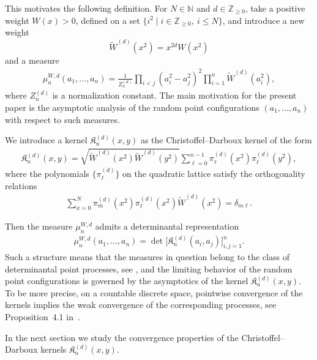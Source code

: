 \documentclass[reqno,11pt]{amsart}
\newcommand{\NN}{\mathbb{N}}
\newcommand{\ZZ}{\mathbb{Z}}
\theoremstyle{plain}
\theoremstyle{definition}
\numberwithin{equation}{section}
\begin{document}
This motivates the following definition. 
For $N\in\NN$ and $d\in\ZZ_{\geq0}$, take a positive weight $W(x)>0$, defined on a set $\{i^2\mid i\in\ZZ_{\geq0},\ i\leq N\}$, and introduce a new weight
\begin{equation*}
    \widetilde{W}^{(d)}(x^2)=x^{2d}W(x^2)
\end{equation*}
and a measure 
\begin{align}
	\mu^{W,d}_n(a_1,...,a_n)=\frac{1}{Z_{n}^{(d)}}\prod\limits_{i<j}(a_i^2-a_j^2)^2\prod\limits_{i=1}^n \widetilde W^{(d)}(a_i^2),
\end{align}
where $Z_{n}^{(d)}$ is a normalization constant. The main motivation for the present paper is the asymptotic analysis of the random point configurations $(a_1,...,a_n)$ with respect to such measures.

We introduce a kernel $\mathfrak{K}^{(d)}_n(x,y)$ as the Christoffel--Darboux kernel of the form
\begin{align}\label{measure_mod}
	\mathfrak{K}^{(d)}_n(x,y)=\sqrt{\widetilde{W}^{(d)}(x^2)\widetilde{W}^{(d)}(y^2)} \sum\limits_{\ell=0}^{n-1}\pi^{(d)}_\ell(x^2)\pi^{(d)}_\ell(y^2),
\end{align}
where the polynomials $\{\pi^{(d)}_\ell\}$ on the quadratic lattice satisfy the orthogonality relations
\begin{align*}
\sum\limits_{x=0}^{N}\pi^{(d)}_m(x^2)\pi^{(d)}_\ell(x^2)\widetilde{W}^{(d)}(x^2)=\delta_{m\ell}.
\end{align*}

Then the measure $\mu^{W,d}_n$ admits a determinantal representation
\begin{align}
  \mu^{W,d}_n(a_1,\dots,a_n) = \det\big[\mathfrak{K}^{(d)}_{n}(a_i,a_j)\big]_{i,j=1}^{n}.
\end{align}
Such a structure means that the measures in question belong to the class of determinantal point processes, see \cite{Mehta, Soshnikov, baik2007discrete}, and the limiting behavior of the random point configurations is governed by the asymptotics of the kernel $\mathfrak{K}^{(d)}_{n}(x,y)$. To be more precise,
on a countable discrete space, 
pointwise convergence of the kernels implies the weak convergence of the corresponding processes, see Proposition~4.1 in~\cite{Borodin_2017}.

In the next section we study the convergence properties of the Christoffel--Darboux kernels $\mathfrak{K}^{(d)}_{n}(x,y)$. 
\end{document}
